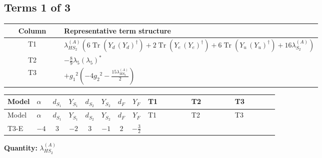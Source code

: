 \documentclass[8pt]{article}
\begin{document}
\begin{landscape}
\subsection*{Terms 1 of 3}
\begin{center}
\begin{tabular}{@{}c >{\raggedright\arraybackslash}p{0.82\linewidth}@{}}
\toprule
Column & Representative term structure \\
\midrule
T1 & \(\displaystyle {\lambda_{HS_2}^{(A)}} (6 \operatorname{Tr}\!\left({Y_d}\,\left({Y_d}\right)^{\dagger}\right)+2 \operatorname{Tr}\!\left({Y_e}\,\left({Y_e}\right)^{\dagger}\right)+6 \operatorname{Tr}\!\left({Y_u}\,\left({Y_u}\right)^{\dagger}\right)+16 {\lambda_{S_2}^{(A)}})\) \\
\midrule
T2 & \(\displaystyle -\frac{8}{9} {\lambda_5} \left({\lambda_5}\right)^{*}\) \\
\midrule
T3 & \(\displaystyle +{g_1}^2 \left(-4 {g_2}^2-\frac{15 {\lambda_{HS_2}^{(A)}}}{2}\right)\) \\
\midrule
\bottomrule
\end{tabular}
\end{center}
\smallskip
\tiny
\begin{longtable}{@{}llcccccc >{\raggedright\arraybackslash}p{0.21\linewidth} >{\raggedright\arraybackslash}p{0.21\linewidth} >{\raggedright\arraybackslash}p{0.21\linewidth}@{}}
\toprule
Model & $\alpha$ & $d_{S_1}$ & $Y_{S_1}$ & $d_{S_2}$ & $Y_{S_2}$ & $d_F$ & $Y_F$ & T1 & T2 & T3 \\
\midrule
\endfirsthead
\toprule
Model & $\alpha$ & $d_{S_1}$ & $Y_{S_1}$ & $d_{S_2}$ & $Y_{S_2}$ & $d_F$ & $Y_F$ & T1 & T2 & T3 \\
\midrule
\endhead
T3-E & $-4$ & $3$ & $-2$ & $3$ & $-1$ & $2$ & $-\frac{3}{2}$ & \scriptsize\adjustbox{max width=\linewidth}{$\begin{gathered} {\lambda_{HS_2}^{(A)}} (6 \operatorname{Tr}\!\left({Y_d}\,\left({Y_d}\right)^{\dagger}\right)+2 \operatorname{Tr}\!\left({Y_e}\,\left({Y_e}\right)^{\dagger}\right)+6 \operatorname{Tr}\!\left({Y_u}\,\left({Y_u}\right)^{\dagger}\right)+16 {\lambda_{S_2}^{(A)}})\end{gathered}$} & \scriptsize\adjustbox{max width=\linewidth}{$\begin{gathered} -\frac{8}{9} {\lambda_5} \left({\lambda_5}\right)^{*}\end{gathered}$} & \scriptsize\adjustbox{max width=\linewidth}{$\begin{gathered} +{g_1}^2 \left(-4 {g_2}^2-\frac{15 {\lambda_{HS_2}^{(A)}}}{2}\right)\end{gathered}$} \\
\midrule
\bottomrule
\end{longtable}
\clearpage
\noindent\textbf{Quantity: }$\lambda_{HS_2}^{(A)}$\par\smallskip

\end{landscape}
\end{document}
